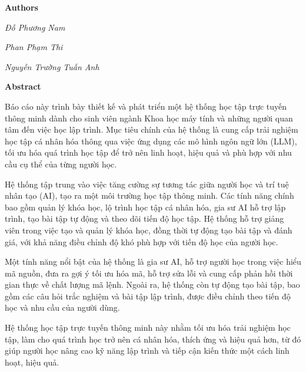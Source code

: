 \documentclass[12pt,a4paper]{report}
\theoremstyle{definition}
\begin{document}
\par\hfill\textbf{Authors}\hspace{1cm}
\par\hfill\textit{Đỗ Phương Nam}
\par\hfill\textit{Phan Phạm Thi}\hspace{0.3cm}
\par\hfill\textit{Nguyễn Trường Tuấn Anh}\hspace{0.2cm}
\newpage

\begin{center}
    \textbf{\Large Abstract}
\end{center}

\par Báo cáo này trình bày thiết kế và phát triển một hệ thống học tập trực tuyến thông minh dành cho sinh viên ngành Khoa học máy tính và những người quan tâm đến việc học lập trình. Mục tiêu chính của hệ thống là cung cấp trải nghiệm học tập cá nhân hóa thông qua việc ứng dụng các mô hình ngôn ngữ lớn (LLM), tối ưu hóa quá trình học tập để trở nên linh hoạt, hiệu quả và phù hợp với nhu cầu cụ thể của từng người học.

\par Hệ thống tập trung vào việc tăng cường sự tương tác giữa người học và trí tuệ nhân tạo (AI), tạo ra một môi trường học tập thông minh. Các tính năng chính bao gồm quản lý khóa học, lộ trình học tập cá nhân hóa, gia sư AI hỗ trợ lập trình, tạo bài tập tự động và theo dõi tiến độ học tập. Hệ thống hỗ trợ giảng viên trong việc tạo và quản lý khóa học, đồng thời tự động tạo bài tập và đánh giá, với khả năng điều chỉnh độ khó phù hợp với tiến độ học của người học.

\par Một tính năng nổi bật của hệ thống là gia sư AI, hỗ trợ người học trong việc hiểu mã nguồn, đưa ra gợi ý tối ưu hóa mã, hỗ trợ sửa lỗi và cung cấp phản hồi thời gian thực về chất lượng mã lệnh. Ngoài ra, hệ thống còn tự động tạo bài tập, bao gồm các câu hỏi trắc nghiệm và bài tập lập trình, được điều chỉnh theo tiến độ học và nhu cầu của người dùng.

\par Hệ thống học tập trực tuyến thông minh này nhằm tối ưu hóa trải nghiệm học tập, làm cho quá trình học trở nên cá nhân hóa, thích ứng và hiệu quả hơn, từ đó giúp người học nâng cao kỹ năng lập trình và tiếp cận kiến thức một cách linh hoạt, hiệu quả.

\newpage

\begin{singlespace}
\tableofcontents
\end{singlespace}
\newpage
\end{document}
